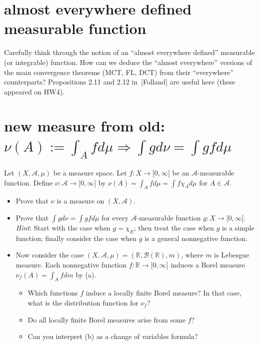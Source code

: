 \section{almost everywhere defined measurable function}\label{almost-everywhere-defined-measurable-function}

Carefully think through the notion of an ``almost everywhere defined'' measurable (or integrable) function. How can we deduce the ``almost everywhere'' versions of the main convergence theorems (MCT, FL, DCT) from their ``everywhere'' counterparts? Propositions 2.11 and 2.12 in~{[}Folland{]} are useful here (these appeared on HW4).

\section{\texorpdfstring{new measure from old: \(\nu(A) := \int_{A}f d\mu\Longrightarrow\int g d\nu = \int gf d\mu\)}{new measure from old: \textbackslash nu(A) := \textbackslash int\_\{A\}f d\textbackslash mu\textbackslash Longrightarrow\textbackslash int g d\textbackslash nu = \textbackslash int gf d\textbackslash mu}}\label{new-measure-from-old-nuaint_a-f-dmu-impliesint-g-d-nu-int-gf-dmu}

Let \((X,\mathcal{A},\mu)\) be a measure space. Let \(f:X\rightarrow\lbrack 0,\infty\rbrack\) be an \(\mathcal{A}\)-measurable function. Define \(\nu:\mathcal{A}\rightarrow\lbrack 0,\infty\rbrack\) by \(\nu(A) = \int_{A}f d\mu = \int f\chi_{A} d\mu\) for \(A \in \mathcal{A}\).

\begin{itemize}
\item
  Prove that \(\nu\) is a measure on \((X,\mathcal{A})\).
\item
  Prove that \(\int g d\nu = \int gf d\mu\) for every \(\mathcal{A}\)-measurable function \(g:X\rightarrow\lbrack 0,\infty\rbrack\). \emph{Hint}: Start with the case when \(g = \chi_{E}\); then treat the case when \(g\) is a simple function; finally consider the case when \(g\) is a general nonnegative function.
\item
  Now consider the case \((X,\mathcal{A},\mu) = (\mathbb{R},\mathcal{B}(\mathbb{R}),m)\), where \(m\) is Lebesgue measure. Each nonnegative function \(f:\mathbb{R}\rightarrow\lbrack 0,\infty\rbrack\) induces a Borel measure \(\nu_{f}(A) = \int_{A}f dm\) by (a).

  \begin{itemize}
  \item
    Which functions \(f\) induce a locally finite Borel measure? In that case, what is the distribution function for \(\nu_{f}\)?
  \item
    Do all locally finite Borel measures arise from some \(f\)?
  \item
    Can you interpret (b) as a change of variables formula?
  \end{itemize}
\end{itemize}

